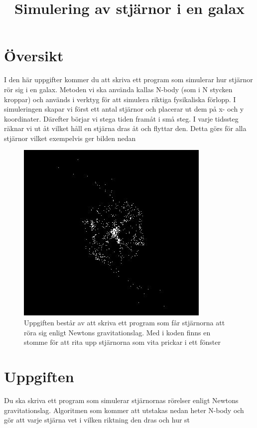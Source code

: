 \documentclass[a4paper]{article}
\title{Simulering av stjärnor i en galax}
\date{}
\begin{document}
	\maketitle


	\section{Översikt}

	I den här uppgifter kommer du att skriva ett program som simulerar hur
stjärnor rör sig i en galax. Metoden vi ska använda kallas N-body (som i N
stycken kroppar) och används i verktyg för att simulera riktiga fysikaliska
förlopp. I simuleringen skapar vi först ett antal stjärnor och placerar ut dem
på x- och y koordinater. Därefter börjar vi stega tiden framåt i små steg. I
varje tidssteg räknar vi ut åt vilket håll en stjärna dras åt och flyttar den.
Detta görs för alla stjärnor vilket exempelvis ger bilden nedan

	\begin{figure}[!h]
	\centering
	\includegraphics[scale=0.5]{galaxy.jpg}
	\caption{Uppgiften består av att skriva ett program som får stjärnorna att röra sig enligt Newtons gravitationslag. Med i koden finns en stomme för att rita upp stjärnorna som vita prickar i ett fönster}
	\end{figure}

	\section{Uppgiften}
	Du ska skriva ett program som simulerar stjärnornas rörelser enligt Newtons gravitationslag. Algoritmen som kommer att utstakas nedan heter N-body och gör att varje stjärna vet i vilken riktning den dras och hur st
\end{document}
